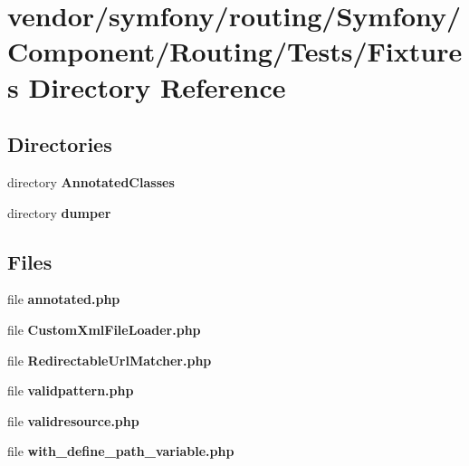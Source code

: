 \section{vendor/symfony/routing/\+Symfony/\+Component/\+Routing/\+Tests/\+Fixtures Directory Reference}
\label{dir_b8db89e4883a8f5764452545be8d9f0b}
\subsection*{Directories}
\begin{DoxyCompactItemize}
\item 
directory {\bf Annotated\+Classes}
\item 
directory {\bf dumper}
\end{DoxyCompactItemize}
\subsection*{Files}
\begin{DoxyCompactItemize}
\item 
file {\bf annotated.\+php}
\item 
file {\bf Custom\+Xml\+File\+Loader.\+php}
\item 
file {\bf Redirectable\+Url\+Matcher.\+php}
\item 
file {\bf validpattern.\+php}
\item 
file {\bf validresource.\+php}
\item 
file {\bf with\+\_\+define\+\_\+path\+\_\+variable.\+php}
\end{DoxyCompactItemize}
